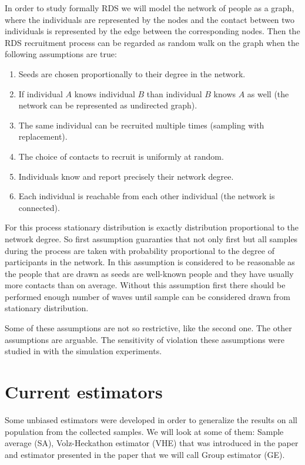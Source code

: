 \documentclass[12pt]{report}
\begin{document}
In order to study formally RDS we will model the network of people as a graph, where the individuals are represented by the nodes and the contact between two individuals is represented by the edge between the corresponding nodes. Then the RDS recruitment process can be regarded as random walk on the graph when the following assumptions are true:
\begin{enumerate}
  \item Seeds are chosen proportionally to their degree in the network.  
  \item If individual $A$ knows individual $B$ than individual $B$ knows $A$ as well (the network can be represented as undirected graph).
  \item The same individual can be recruited multiple times (sampling with replacement).
  \item The choice of contacts to recruit is uniformly at random.
  \item Individuals know and report precisely their network degree. 
  \item Each individual is reachable from each other individual (the network is connected). 
\end{enumerate}


For this process stationary distribution is exactly distribution proportional to the network degree. So first assumption guaranties that not only first but all samples during the process are taken with probability proportional to the degree of participants in the network. In \cite{salganik2004sampling} this assumption is considered to be reasonable as the people that are drawn as seeds are well-known people and they have usually more contacts than on average. Without this assumption first there should be performed enough number of waves until sample can be considered drawn from stationary distribution. 

Some of these assumptions are not so restrictive, like the second one. The other assumptions are arguable. The sensitivity of violation these assumptions were studied in \cite{gile2010respondent} with the simulation experiments. 


\section{Current estimators}
\label{sec:Current estimators}

Some unbiased estimators were developed in order to generalize the results on all population from the collected samples. We will look at some of them: Sample average (SA), Volz-Heckathon estimator (VHE) that was introduced in the paper \cite{volz2008probability} and estimator presented in the paper \cite{salganik2004sampling} that we will call Group estimator (GE). 
\end{document}
